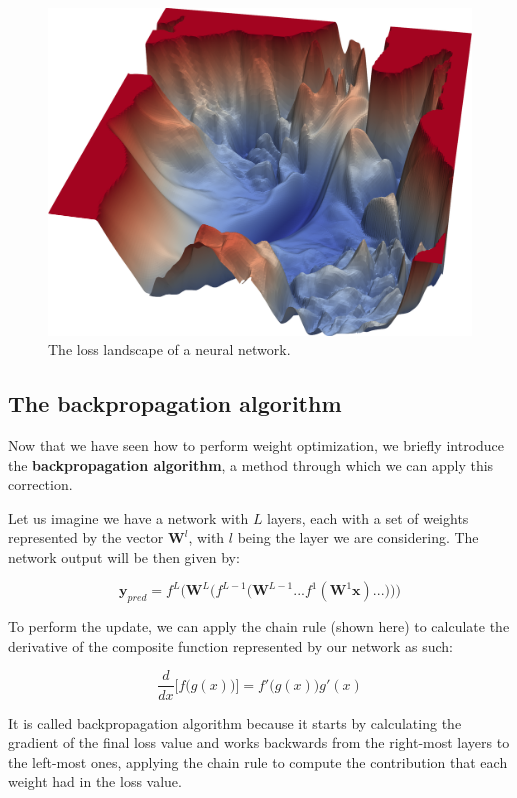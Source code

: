 \begin{figure}[htb]
    \centering
    \includegraphics[scale=0.15]{Images/Chapter 6/landscape.png}
    \caption{The loss landscape of a neural network.}
    \label{fig:ch6-losslandscape}
\end{figure}

\subsection{The backpropagation algorithm}
Now that we have seen how to perform weight optimization, we briefly introduce the \textbf{backpropagation algorithm}, a method through which we can apply this correction.

Let us imagine we have a network with $L$ layers, each with a set of weights represented by the vector $\boldsymbol{W}^l$, with $l$ being the layer we are considering. The network output will be then given by:

\begin{equation}
    \boldsymbol{y}_{pred} = f^L \Bigg(\boldsymbol{W}^L \Big(f^{L-1} \big(\boldsymbol{W}^{L-1} ... f^1 \left(\boldsymbol{W}^1 \boldsymbol{x}\right) ...\big)\Big)\Bigg)
    \label{eq:ch6-nnoutput}
\end{equation}

To perform the update, we can apply the chain rule (shown here) to calculate the derivative of the composite function represented by our network as such:

\begin{equation*}
    \frac{d}{dx} \Big[ f \big( g(x) \big) \Big] = f' \big( g(x) \big) g' (x)
\end{equation*}

It is called backpropagation algorithm because it starts by calculating the gradient of the final loss value and works backwards from the right-most layers to the left-most ones, applying the chain rule to compute the contribution that each weight had in the loss value.